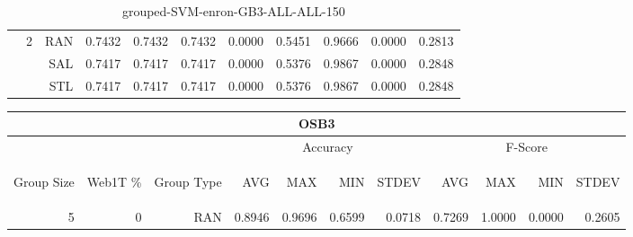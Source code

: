 \begin{center}
\begin{table}[htbp]
\begin{center}
\begin{tabular}{ | r | r | r | r | r | r | r | r | r | r | r |}
 & \multirow{3}{*}{2} & RAN & 0.7432 & 0.7432 & 0.7432 & 0.0000 & 0.5451 & 0.9666 & 0.0000 & 0.2813\\ \cline{3-11}
 &   & SAL & 0.7417 & 0.7417 & 0.7417 & 0.0000 & 0.5376 & 0.9867 & 0.0000 & 0.2848\\ \cline{3-11}
 &   & STL & 0.7417 & 0.7417 & 0.7417 & 0.0000 & 0.5376 & 0.9867 & 0.0000 & 0.2848\\ \cline{2-11}
\hline
\end{tabular}
\caption{grouped-SVM-enron-GB3-ALL-ALL-150}
\end{center}
 \end{table}
\end{center}

\begin{center}
\begin{table}[htbp] 
 \begin{center}
\begin{tabular}{ | r | r | r | r | r | r | r | r | r | r | r |}
\hline
\multicolumn{11}{|c|}{OSB3}\\
\hline
 & & & \multicolumn{4}{|c|}{Accuracy} & \multicolumn{4}{|c|}{F-Score}\\ \cline{4-11}
\begin{sideways}Group Size\end{sideways} & \begin{sideways}Web1T \%\end{sideways} & \begin{sideways}Group Type\end{sideways} & \begin{sideways}AVG\end{sideways} & \begin{sideways}MAX\end{sideways} & \begin{sideways}MIN\end{sideways} & \begin{sideways}STDEV\end{sideways} & \begin{sideways}AVG\end{sideways} & \begin{sideways}MAX\end{sideways} & \begin{sideways}MIN\end{sideways} & \begin{sideways}STDEV\end{sideways}\\
\hline
\multirow{18}{*}{5}
 & \multirow{3}{*}{0} & RAN & 0.8946 & 0.9696 & 0.6599 & 0.0718 & 0.7269 & 1.0000 & 0.0000 & 0.2605\\ \cline{3-11}

\end{tabular}
\end{center}
\end{table}
\end{center}
